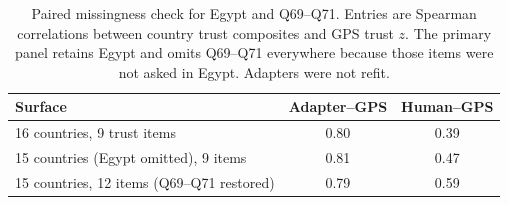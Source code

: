 \begin{table}[htbp]\centering\small
\caption{Paired missingness check for Egypt and Q69--Q71. Entries are Spearman correlations between country trust composites and GPS trust $z$. The primary panel retains Egypt and omits Q69--Q71 everywhere because those items were not asked in Egypt. Adapters were not refit.}\label{tab:egypt}
\begin{tabular}{lcc}\toprule
Surface & Adapter--GPS & Human--GPS \\\midrule
16 countries, 9 trust items & 0.80 & 0.39 \\
15 countries (Egypt omitted), 9 items & 0.81 & 0.47 \\
15 countries, 12 items (Q69--Q71 restored) & 0.79 & 0.59 \\
\bottomrule
\end{tabular}\end{table}
